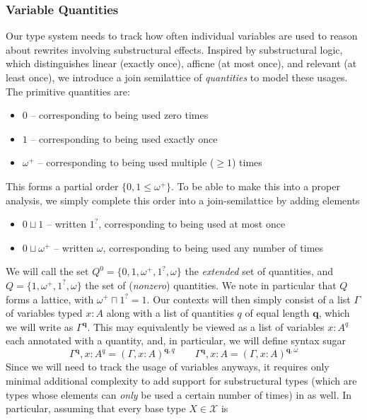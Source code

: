 \documentclass[acmsmall,screen,review]{acmart}
\newcommand{\mc}[1]{\ensuremath{\mathcal{#1}}}
\newcommand{\mb}[1]{\ensuremath{\mathbf{#1}}}
\newcommand{\zeroq}{0}
\newcommand{\oneq}{1}
\newcommand{\delq}{1^?}
\newcommand{\cpyq}{\omega^+}
\newcommand{\topq}{\omega}
\begin{document}
\subsubsection{Variable Quantities}
Our type system needs to track how often individual variables are used  to
reason about rewrites involving substructural effects. Inspired by substructural logic, which distinguishes linear (exactly once), afficne (at most once), and relevant (at least once), we introduce a join semilattice of \emph{quantities} to model these usages. The primitive quantities are:
\begin{itemize}
  \item $\zeroq$ -- corresponding to being used zero times
  \item $\oneq$ -- corresponding to being used exactly once
  \item $\cpyq$ -- corresponding to being used multiple ($\geq 1$) times
\end{itemize}
This forms a partial order $\{\zeroq, \oneq \leq \cpyq\}$. To be able to make this into a proper
analysis, we simply complete this order into a join-semilattice by adding elements
\begin{itemize}
  \item $\zeroq \sqcup \oneq$ -- written $\delq$, corresponding to being used at most once
  \item $\zeroq \sqcup \cpyq$ -- written $\topq$, corresponding to being used any number of times
\end{itemize}
We will call the set $Q^0 = \{\zeroq, \oneq, \cpyq, \delq, \topq\}$ the \emph{extended} set of
quantities, and $Q = \{\oneq, \cpyq, \delq, \topq\}$ the set of (\emph{nonzero}) quantities. We note
in particular that $Q$ forms a lattice, with $\cpyq \sqcap \delq = 1$. Our contexts will then simply
consist of a list $\Gamma$ of variables typed $x : A$ along with a list of quantities $q$ of equal
length $\mb{q}$, which we will write as $\Gamma^{\mb{q}}$. This may equivalently be viewed as a list
of variables $x : A^q$ each annotated with a quantity, and, in particular, we will define syntax
sugar
\begin{equation}
  \Gamma^{\mb{q}}, x : A^q = (\Gamma, x : A)^{\mb{q}, q} \qquad
  \Gamma^{\mb{q}}, x : A =  (\Gamma, x : A)^{\mb{q}, \topq}
\end{equation}
Since we will need to track the usage of variables anyways, it requires only minimal additional
complexity to add support for substructural types (which are types whose elements can \emph{only} be used a
certain number of times) in as well. In particular, assuming that every base type $X \in \mc{X}$ is
\end{document}

